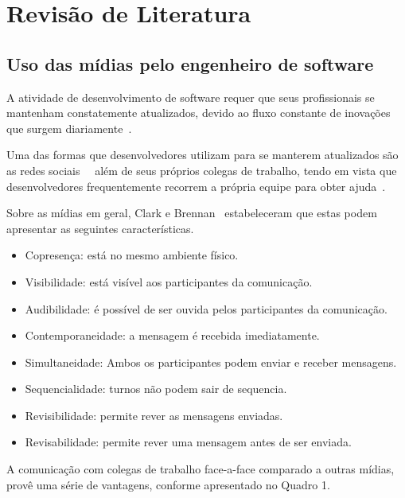 \chapter{Revisão de Literatura}

\section{Uso das mídias pelo engenheiro de software}

A atividade de desenvolvimento de software requer que seus profissionais se mantenham constatemente atualizados, devido ao fluxo constante de inovações que surgem diariamente~\cite{Singer2014}.

Uma das formas que desenvolvedores utilizam para se manterem atualizados são as redes sociais~\cite{Treude2012}~\cite{Storey2014} além de seus próprios colegas de trabalho, tendo em vista que desenvolvedores frequentemente recorrem a própria equipe para obter ajuda~\cite{Weinberg1998}.

Sobre as mídias em geral, Clark e Brennan~\cite{Clark1991} estabeleceram que estas podem apresentar as seguintes características.

\begin{itemize}
  \item Copresença: está no mesmo ambiente físico.
  \item Visibilidade: está visível aos participantes da comunicação.
  \item Audibilidade: é possível de ser ouvida pelos participantes da comunicação.
  \item Contemporaneidade: a mensagem é recebida imediatamente.
  \item Simultaneidade: Ambos os participantes podem enviar e receber mensagens.
  \item Sequencialidade: turnos não podem sair de sequencia.
  \item Revisibilidade: permite rever as mensagens enviadas.
  \item Revisabilidade: permite rever uma mensagem antes de ser enviada.
\end{itemize}

A comunicação com colegas de trabalho face-a-face comparado a outras mídias, provê uma série de vantagens, conforme apresentado no Quadro 1.


